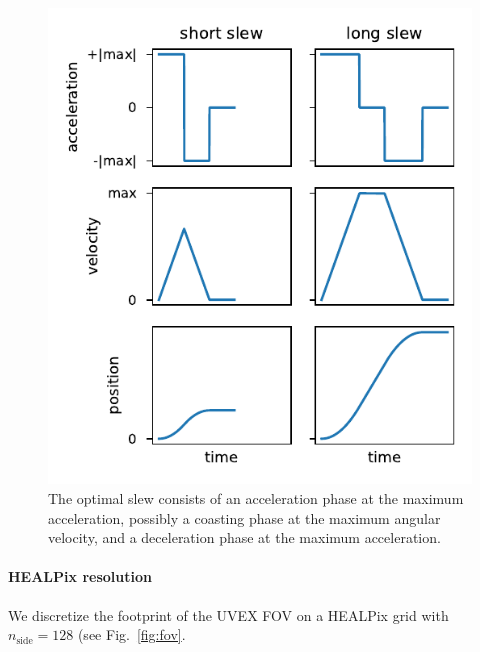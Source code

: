 \documentclass[twocolumn,times]{aastex631}
\begin{document}
\begin{figure}
    \includegraphics[width=\columnwidth]{figures/slew}
    \caption{\label{fig:slew}The optimal slew consists of an acceleration phase at the maximum acceleration, possibly a coasting phase at the maximum angular velocity, and a deceleration phase at the maximum acceleration.}
\end{figure}

\paragraph{\ac{HEALPix} resolution}
We discretize the footprint of the \ac{UVEX} \ac{FOV} on a \ac{HEALPix} grid with $n_\mathrm{side} = 128$ (see Fig.~\ref{fig:fov}.
\end{document}
